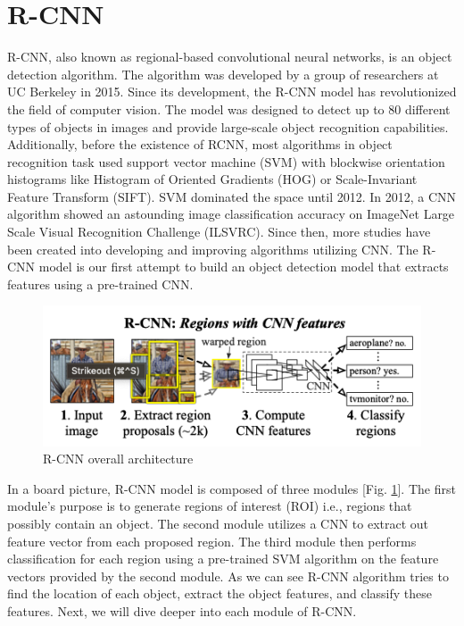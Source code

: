 \section{R-CNN}

R-CNN, also known as regional-based convolutional neural networks, is an object detection algorithm. The algorithm was developed by a group of researchers at UC Berkeley in 2015. Since its development, the R-CNN model has revolutionized the field of computer vision. The model was designed to detect up to 80 different types of objects in images and provide large-scale object recognition capabilities. Additionally, before the existence of RCNN, most algorithms in object recognition task used support vector machine (SVM) with blockwise orientation histograms like Histogram of Oriented Gradients (HOG) or Scale-Invariant Feature Transform (SIFT). SVM dominated the space until 2012. In 2012, a CNN algorithm showed an astounding image classification accuracy on ImageNet Large Scale Visual Recognition Challenge (ILSVRC). Since then, more studies have been created into developing and improving algorithms utilizing CNN. The R-CNN model is our first attempt to build an object detection model that extracts features using a pre-trained CNN.

\begin{figure}[!ht]
    \centering
    \includegraphics[width=4.5in]{figures/rcnn_archiet.png}
    \caption{R-CNN overall architecture \cite{Girshick_R_CNN_2013}} \label{fig:rcnn_archiet}
\end{figure}

In a board picture, R-CNN model is composed of three modules [Fig. \ref{fig:rcnn_archiet}]. The first module's purpose is to generate regions of interest (ROI) i.e., regions that possibly contain an object. The second module utilizes a CNN to extract out feature vector from each proposed region. The third module then performs classification for each region using a pre-trained SVM algorithm on the feature vectors provided by the second module. As we can see R-CNN algorithm tries to find the location of each object, extract the object features, and classify these features. Next, we will dive deeper into each module of R-CNN.

